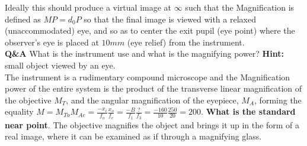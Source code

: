 \documentclass[main.tex]{subfiles}
\begin{document}
Ideally this should produce a virtual image at $\infty$ such that the Magnification is defined as $MP=d_0P$ so that the final image is viewed with a relaxed (unaccommodated) eye, and so as to center the exit pupil (eye point) where the observer's eye is placed at $10mm$ (eye relief) from the instrument.\\



\textbf{Q\&A} What is the instrument use and what is the magnifying power? \textbf{Hint:} small object viewed by an eye.\\

The instrument is a rudimentary compound microscope and the Magnification power of the entire system is the product of the transverse linear magnification of the objective $M_T$, and the angular magnification of the eyepiece, $M_A$, forming the equality $M = M_{To} M_{Ae} = \frac{-x_i}{f_o} \frac{x_o}{f_e} = \frac{-B}{f_1} \frac{?}{f_3} = \frac{-160}{10} \frac{250}{20} = 200$. \textbf{What is the standard near point}. The objective magnifies the object and brings it up in the form of a real image, where it can be examined as if through a magnifying glass.  
\end{document}
